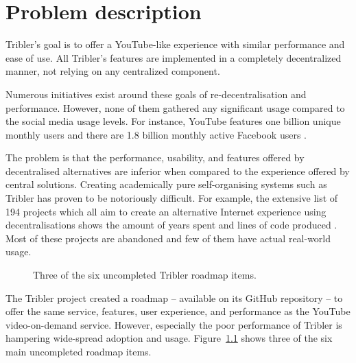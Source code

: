 \chapter{Problem description}
\label{chp:problem-description}

Tribler's goal is to offer a YouTube-like experience with similar performance and ease of use.
All Tribler's features are implemented in a completely decentralized manner, not relying on any centralized component.

Numerous initiatives exist around these goals of re-decentralisation and performance.
However, none of them gathered any significant usage compared to the social media usage levels. 
For instance, YouTube features one billion unique monthly users \cite{mainka2014government} and there are 1.8 billion monthly active Facebook users \cite{sharma2016strategies}.

The problem is that the performance, usability, and features offered by decentralised alternatives are inferior when compared to the experience offered by central solutions.
Creating academically pure self-organising systems such as Tribler has proven to be notoriously difficult.
For example, the extensive list of 194 projects which all aim to create an alternative Internet experience using decentralisations shows the amount of years spent and lines of code produced \cite{redecentralize2016alternative}.
Most of these projects are abandoned and few of them have actual real-world usage.

\begin{figure}[!h]
	\caption{Three of the six uncompleted Tribler roadmap items.}
	\label{fig:tribler_roadmap}
\end{figure}

The Tribler project created a roadmap -- available on its GitHub repository -- to offer the same service, features, user experience, and performance as the YouTube video-on-demand service.
However, especially the poor performance of Tribler is hampering wide-spread adoption and usage. Figure~\ref{fig:tribler_roadmap} shows three of the six main uncompleted roadmap items.

